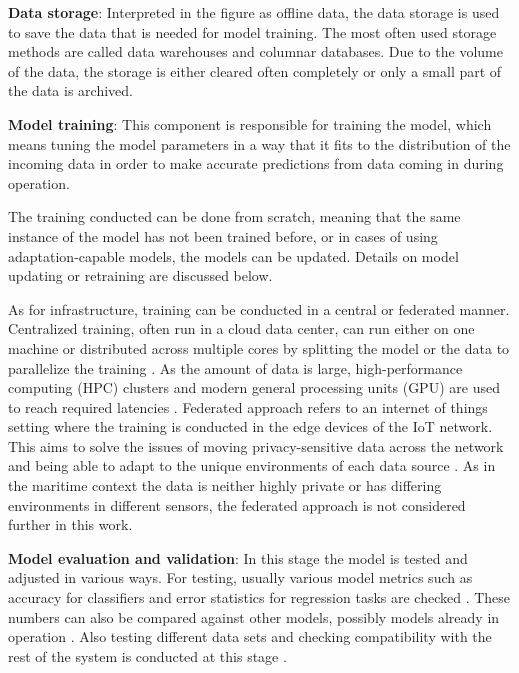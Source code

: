 \textbf{Data storage}: Interpreted in the figure as offline data, the data storage is used to save the data that is needed for model training. The most often used storage methods are called data warehouses and columnar databases. Due to the volume of the data, the storage is either cleared often completely or only a small part of the data is archived.

\textbf{Model training}: This component is responsible for training the model, which means tuning the model parameters in a way that it fits to the distribution of the incoming data in order to make accurate predictions from data coming in during operation.

The training conducted can be done from scratch, meaning that the same instance of the model has not been trained before, or in cases of using adaptation-capable models, the models can be updated. Details on model updating or retraining are discussed below.

As for infrastructure, training can be conducted in a central or federated manner. Centralized training, often run in a cloud data center, can run either on one machine or distributed across multiple cores by splitting the model or the data to parallelize the training \cite{iotsurvey}. As the amount of data is large, high-performance computing (HPC) clusters and modern general processing units (GPU) are used to reach required latencies \cite{iotsurvey}. Federated approach refers to an internet of things setting where the training is conducted in the edge devices of the IoT network. This aims to solve the issues of moving privacy-sensitive data across the network and being able to adapt to the unique environments of each data source \cite{iotsurvey}. As in the maritime context the data is neither highly private or has differing environments in different sensors, the federated approach is not considered further in this work.

\textbf{Model evaluation and validation}: In this stage the model is tested and adjusted in various ways. For testing, usually various model metrics such as accuracy for classifiers and error statistics for regression tasks are checked \cite{iotsurvey}. These numbers can also be compared against other models, possibly models already in operation \cite{googlemlops}. Also testing different data sets and checking compatibility with the rest of the system is conducted at this stage \cite{googlemlops}.


